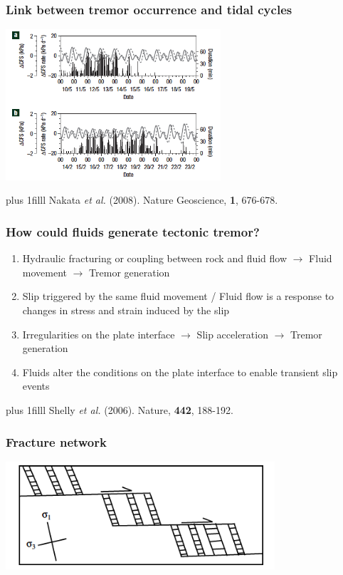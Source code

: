 \documentclass{beamer}
\newcommand{\btVFill}{\vskip0pt plus 1filll}
\begin{document}
	\begin{frame}
		\frametitle{Link between tremor occurrence and tidal cycles}
		\begin{center}
			\includegraphics[trim={0cm 0cm 0cm 0cm}, clip, width=8cm]{articles/nakata_al_2008_2.png}
		\end{center}
		\btVFill
		\tiny{Nakata \textit{et al.} (2008). Nature Geoscience, \textbf{1}, 676-678.}
	\end{frame}

	\begin{frame}
		\frametitle{How could fluids generate tectonic tremor?}
		\vspace{1em}

		\begin{enumerate}
			\item Hydraulic fracturing or coupling between rock and fluid flow $\rightarrow$ Fluid movement $\rightarrow$ Tremor generation
			\item[] Slip triggered by the same fluid movement / Fluid flow is a response to changes in stress and strain induced by the slip

			\vspace{2em}

			\item Irregularities on the plate interface $\rightarrow$ Slip acceleration $\rightarrow$ Tremor generation
			\item[] Fluids alter the conditions on the plate interface to enable transient slip events
		\end{enumerate}
		\btVFill
		\tiny{Shelly \textit{et al.} (2006). Nature, \textbf{442}, 188-192.}
	\end{frame}

	\begin{frame}
		\frametitle{Fracture network}
		\begin{center}
			\includegraphics[trim={0cm 0cm 0cm 0cm}, clip, width=10cm]{articles/fagereng_harris_2014_8b.png}
		\end{center}
	\end{frame}
\end{document}
